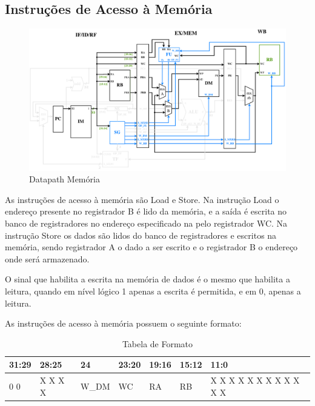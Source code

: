 \documentclass{report}
\begin{document}
\subsection{Instruções de Acesso à Memória}
\begin{figure}[H]
\centering
\includegraphics[width=\textwidth]{./pictures/DatapathMEM.pdf}
\caption{Datapath Memória}
\end{figure}

As instruções de acesso à memória são Load e Store. Na instrução Load o endereço presente no registrador B é lido da memória, e a saída é escrita no banco de registradores no endereço especificado na pelo registrador WC. Na instrução Store os dados são lidos do banco de registradores e escritos na memória, sendo registrador A o dado a ser escrito e o registrador B o endereço onde será armazenado. 

O sinal que habilita a escrita na memória de dados é o mesmo que habilita a leitura, quando em nível lógico 1 apenas a escrita é permitida, e em 0, apenas a leitura.

As instruções de acesso à memória possuem o seguinte formato:

\FloatBarrier
\begin{table}[H]
  \begin{center}
  \renewcommand{\arraystretch}{1.2}
    \begin{tabular}[pos]{|>{\centering\arraybackslash}m{30pt}|>{\centering\arraybackslash}m{42pt}|>{\centering\arraybackslash}m{42pt}|>{\centering\arraybackslash}m{35pt}|>{\centering\arraybackslash}m{35pt}|>{\centering\arraybackslash}m{35pt}|>{\centering\arraybackslash}m{121pt}|} \hline
      \cellcolor[gray]{0.9}\textbf{31:29} & 
      \cellcolor[gray]{0.9}\textbf{28:25} & 
      \cellcolor[gray]{0.9}\textbf{24} & 
      \cellcolor[gray]{0.9}\textbf{23:20} & 
      \cellcolor[gray]{0.9}\textbf{19:16} & 
      \cellcolor[gray]{0.9}\textbf{15:12} & 
      \cellcolor[gray]{0.9}\textbf{11:0} \\ \hline
      1 0 0         & X X X X &W\_DM & WC        & RA        & RB        & X X X X X X X X X X X X \\ \hline
    \end{tabular}
    \caption{Tabela de Formato}
    \end{center}
\end{table}  
\end{document}
